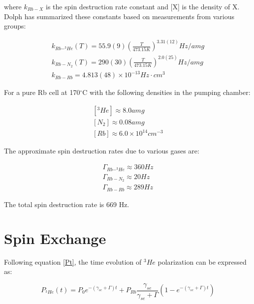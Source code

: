 where $k_{Rb-X}$ is the spin destruction rate constant and [X] is the density of X. Dolph has summarized these constants based on measurements from various groups:

\begin{subequations}
	\begin{gather}
	k_{Rb-^{3}He}(T)=55.9(9)\left(\frac{T}{473.15K}\right)^{3.31(12)}Hz/amg\\
	k_{Rb-N_{2}}(T)=290(30)\left(\frac{T}{473.15K}\right)^{2.0(25)}Hz/amg\\
	k_{Rb-Rb}=4.813(48)\times 10^{-13}Hz\cdot cm^{3}
	\end{gather}
\end{subequations}

For a pure Rb cell at 170$^{\circ}$C with the following densities in the pumping chamber:

\begin{subequations}
	\begin{gather}
	[^{3}He] \approx 8.0 amg\\
	[N_{2}] \approx 0.08 amg\\
	[Rb] \approx 6.0 \times 10^{14} cm^{-3}
	\end{gather}
\end{subequations}

The approximate spin destruction rates due to various gases are:

\begin{subequations}
	\begin{gather}
	\Gamma_{Rb-^{3}He} \approx 360Hz\\
	\Gamma_{Rb-N_{2}} \approx 20Hz\\
	\Gamma_{Rb-Rb} \approx 289Hz
	\end{gather}
\end{subequations}

The total spin destruction rate is 669 Hz.

\section{Spin Exchange}

Following equation \ref{Pt}, the time evolution of $^{3}He$ polarization can be expressed as:

\begin{equation}
P_{^{3}He}(t) = P_{0}e^{-(\gamma_{se}+\Gamma)t} + P_{Rb} \frac{\gamma_{se}}{\gamma_{se}+\Gamma}(1-e^{-(\gamma_{se}+\Gamma)t})
\end{equation}

